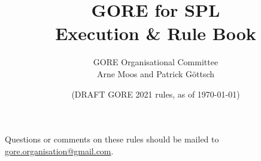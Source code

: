 \documentclass[12pt]{article}
\title{GORE for SPL\\ Execution \& Rule Book}
\author{GORE Organisational Committee\\ Arne Moos and Patrick Göttsch}
\date{(DRAFT GORE 2021 rules, as of \today)}
\begin{document}
  \maketitle

  \begin{center}
  Questions or comments on these rules should be mailed to \\\url{gore.organisation@gmail.com}.
  \end{center}

  \newpage

  \setcounter{tocdepth}{4}
  \setcounter{secnumdepth}{4}
  \tableofcontents

  \thispagestyle{fancy}

  \clearpage

  \cfoot{\thepage}
  \setcounter{page}{1}

  \newpage

  
  \newpage
  
  \newpage
  
\end{document}
